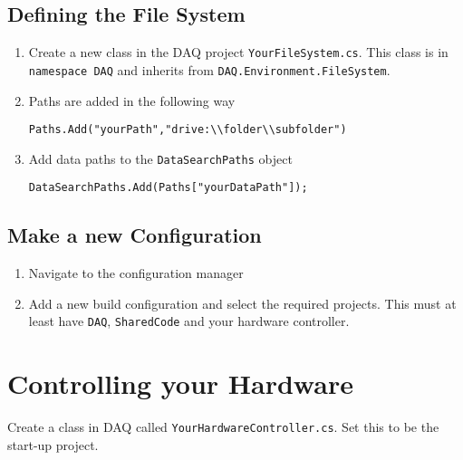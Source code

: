\documentclass{article}
\begin{document}
\subsection{Defining the File System}
\begin{enumerate}
\item Create a new class in the DAQ project \lstinline|YourFileSystem.cs|. This class is in \lstinline|namespace DAQ| and inherits from \lstinline|DAQ.Environment.FileSystem|.
\item Paths are added in the following way
\begin{lstlisting}
Paths.Add("yourPath","drive:\\folder\\subfolder")
\end{lstlisting}
\item Add data paths to the \lstinline|DataSearchPaths| object
\begin{lstlisting}
DataSearchPaths.Add(Paths["yourDataPath"]);
\end{lstlisting}
\end{enumerate}
\subsection{Make a new Configuration}
\begin{enumerate}
\item Navigate to the configuration manager
\item Add a new build configuration and select the required projects. This must at least have \lstinline|DAQ|, \lstinline|SharedCode| and your hardware controller.
\end{enumerate}
\section{Controlling your Hardware}
Create a class in DAQ called \lstinline|YourHardwareController.cs|. Set this to be the start-up project.
\end{document}
